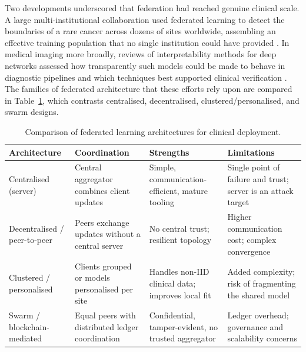 \documentclass[11pt,a4paper]{article}
\begin{document}
Two developments underscored that federation had reached genuine clinical scale.
A large multi-institutional collaboration used federated learning to detect the
boundaries of a rare cancer across dozens of sites worldwide, assembling an
effective training population that no single institution could have provided
\cite{ref33}. In medical imaging more broadly, reviews of interpretability
methods for deep networks assessed how transparently such models could be made to
behave in diagnostic pipelines and which techniques best supported clinical
verification \cite{ref34}. The families of federated architecture that these
efforts rely upon are compared in Table~\ref{tab:fl}, which contrasts
centralised, decentralised, clustered/personalised, and swarm designs.

\begin{table}[t]
  \centering
  \caption{Comparison of federated learning architectures for clinical
  deployment.}
  \label{tab:fl}
  \small
  \begin{tabularx}{\textwidth}{@{}l X X X@{}}
    \toprule
    \textbf{Architecture} & \textbf{Coordination} & \textbf{Strengths} & \textbf{Limitations} \\
    \midrule
    Centralised (server) & Central aggregator combines client updates & Simple, communication-efficient, mature tooling & Single point of failure and trust; server is an attack target \\
    Decentralised / peer-to-peer & Peers exchange updates without a central server & No central trust; resilient topology & Higher communication cost; complex convergence \\
    Clustered / personalised & Clients grouped or models personalised per site & Handles non-IID clinical data; improves local fit & Added complexity; risk of fragmenting the shared model \\
    Swarm / blockchain-mediated & Equal peers with distributed ledger coordination & Confidential, tamper-evident, no trusted aggregator & Ledger overhead; governance and scalability concerns \\
    \bottomrule
  \end{tabularx}
\end{table}
\end{document}
